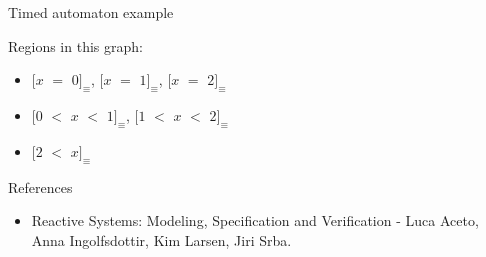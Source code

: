 \documentclass{beamer}
\begin{document}
\begin{frame}{Timed automaton example}

  
  Regions in this graph:
  \begin{itemize}
    \item $[x$ $=$ $0]_{\equiv}$, $[x$ $=$ $1]_{\equiv}$, $[x$ $=$
      $2]_{\equiv}$
    \item $[0$ $<$ $x$ $<$ $1]_{\equiv}$, $[1$ $<$ $x$ $<$
      $2]_{\equiv}$
    \item $[2$ $<$ $x]_{\equiv}$
  \end{itemize}

\end{frame}

\begin{frame}{References}

\begin{itemize}
\item Reactive Systems: Modeling, Specification and Verification -
  Luca Aceto, Anna Ingolfsdottir, Kim Larsen, Jiri Srba.
\end{itemize}

\end{frame}
\end{document}
